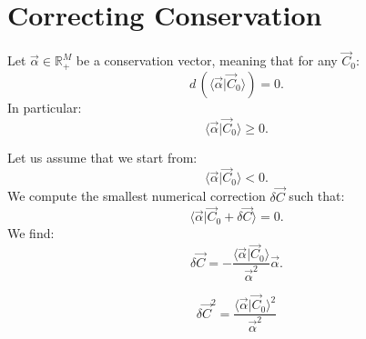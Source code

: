\documentclass[aps,12pt]{revtex4}
\begin{document}
\section{Correcting Conservation}

Let $\vec{\alpha}\in\mathbb{R}_+^M$ be a conservation vector, meaning that for any $\vec{C}_0$:
\begin{equation}
d\,\left(\langle \vec{\alpha} \vert \vec{C}_0 \rangle\right) = 0.
\end{equation}
In particular:
\begin{equation}
	\langle \vec{\alpha} \vert \vec{C}_0 \rangle \geq 0.
\end{equation}

Let us assume that we start from:
\begin{equation}
	\langle \vec{\alpha} \vert \vec{C}_0 \rangle < 0.
\end{equation}
We compute the smallest numerical correction $\delta\vec{C}$ such that:
\begin{equation}
	\langle \vec{\alpha} \vert \vec{C}_0 + \delta\vec{C} \rangle = 0.
\end{equation}
We find:
\begin{equation}
	\delta\vec{C} =
	 -\dfrac{\langle \vec{\alpha} \vert \vec{C}_0 \rangle}{\vec{\alpha}^2}
	  \vec{\alpha}.
\end{equation}

\begin{equation}
	\delta\vec{C}^2 = \dfrac{\langle \vec{\alpha} \vert \vec{C}_0 \rangle^2}{\vec{\alpha}^2}
\end{equation}
	
\end{document}

